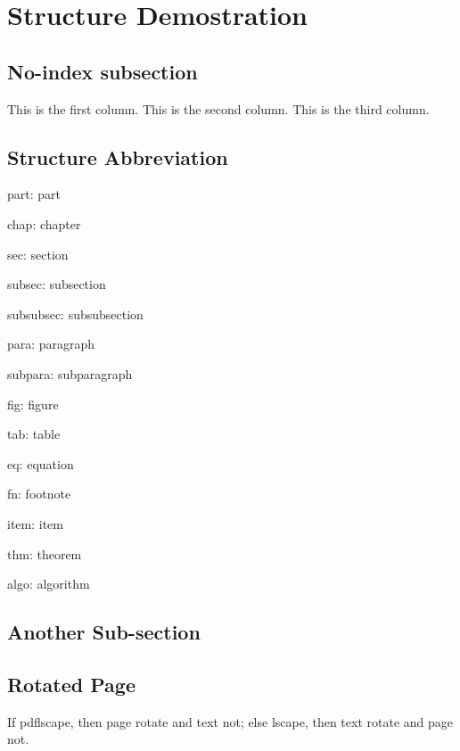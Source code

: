 \thispagestyle{plain}

\section[Structure]{Structure Demostration}
\subsection*{No-index subsection}
\begin{multicols}{3}
    This is the first column.
    \columnbreak
    This is the second column.
    \columnbreak
    This is the third column.
\end{multicols}

\subsection{Structure Abbreviation}
part: part \par
chap: chapter \par
sec: section \par
subsec: subsection \par
subsubsec: subsubsection \par
para: paragraph \par
subpara: subparagraph \par
fig: figure \par
tab: table \par
eq: equation \par
fn: footnote \par
item: item \par
thm: theorem \par
algo: algorithm

\newpage    %

\subsection{Another Sub-section}

\onecolumn

\begin{landscape}           %
    \subsection{Rotated Page}
    If pdflscape, then page rotate and text not; else lscape, then text rotate and page not.
\end{landscape}

\endinput

Here can comment without mark.